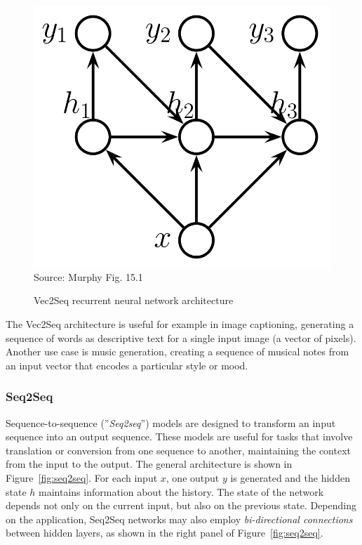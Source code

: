 \begin{figure}
\centering
\includegraphics[width=.375\textwidth]{vec2seq.png} \\

\scriptsize Source: Murphy Fig. 15.1
\caption{Vec2Seq recurrent neural network architecture}
\label{fig:vec2seq}
\end{figure}

The Vec2Seq architecture is useful for example in image captioning, generating a sequence of words as descriptive text for a single input image (a vector of pixels). Another use case is music generation, creating a sequence of musical notes from an input vector that encodes a particular style or mood.

\subsubsection*{Seq2Seq}

Sequence-to-sequence (''\emph{Seq2seq}'') models are designed to transform an input sequence into an output sequence. These models are useful for tasks that involve translation or conversion from one sequence to another, maintaining the context from the input to the output. The general architecture is shown in Figure~\ref{fig:seq2seq}. For each input $x$, one output $y$ is generated and the hidden state $h$ maintains information about the history. The state of the network depends not only on the current input, but also on the previous state. Depending on the application, Seq2Seq networks may also employ \emph{bi-directional connections} between hidden layers, as shown in the right panel of Figure~\ref{fig:seq2seq}.


